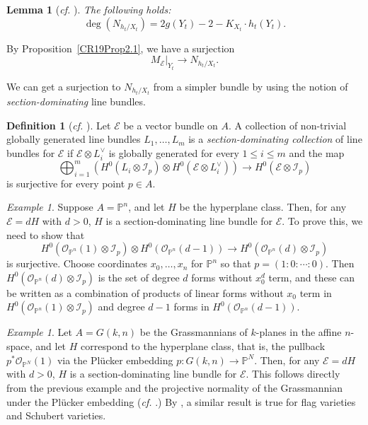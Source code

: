 \documentclass[11pt]{amsart}
\numberwithin{equation}{section}
\newtheorem{lemma}[theorem]{Lemma}
\theoremstyle{definition}
\newtheorem{definition}[theorem]{Definition}
\theoremstyle{remark}
\newtheorem{example}[theorem]{Example}
\newcommand{\cI}{\mathcal{I}}
\newcommand{\cO}{\mathcal{O}}
\renewcommand{\P}{\mathbb{P}}
\newcommand{\lra}{\longrightarrow}
\begin{document}
\begin{lemma}[\textit{cf.} {\cite[Lemma 2.2]{CR19}}] \label{deggenus}
The following holds:
\[ \deg \left(N_{h_t/X_t}\right) = 2g(Y_t)-2 - K_{X_t}\cdot h_t(Y_t). \]
\end{lemma}

By Proposition~\ref{CR19Prop2.1}, we have a surjection
\begin{equation}\label{surjection_from_M_E}
    M_{\mathcal{E}}|_{Y_t}\lra N_{h_t/X_t}.
\end{equation}

We can get a surjection to $N_{h_t/X_t}$ from a simpler bundle by using the notion of \textit{section-dominating} line bundles.

\begin{definition}[\textit{cf.} {\cite[Definition 2.3]{CR19}}]\label{definition_section_dominating}
Let $\mathcal{E}$ be a vector bundle on $A$. A collection of non-trivial globally generated line bundles $L_1, \hdots , L_m$ is a \textit{section-dominating collection} of line bundles for $\mathcal{E}$ if $\mathcal{E}\otimes L_i^\vee$ is globally generated for every $1\le i\le m$ and the map
\[ \bigoplus_{i=1}^{m} \left ( H^0(L_i\otimes \cI_p)\otimes H^0\left(\mathcal{E}\otimes L_i^\vee\right) \right )\lra H^0(\mathcal{E}\otimes \cI_p) \]
is surjective for every point $p\in A$.
\end{definition}

\begin{example}
Suppose $A = \P^n$, and let $H$ be the hyperplane class. Then, for any $\mathcal{E} = dH$ with $d>0$, $H$ is a section-dominating line bundle for $\mathcal{E}$. To prove this, we need to show that
\[ H^0\left(\cO_{\P^n}(1)\otimes \cI_p\right)\otimes H^0\left(\cO_{\P^n}(d-1)\right)\lra H^0\left(\cO_{\P^n}(d)\otimes \cI_p\right) \]
is surjective. Choose coordinates $x_0, \hdots , x_n$ for $\P^n$ so that $p=(1:0:\cdots:0)$. Then
$H^0(\cO_{\P^n}(d)\otimes \cI_p)$ is the set of degree $d$ forms without $x_0^d$ term, and these can be written as a combination of products of linear forms without $x_0$ term in $H^0(\cO_{\P^n}(1)\otimes \cI_p)$ and degree $d-1$ forms in $H^0(\cO_{\P^n}(d-1))$.
\end{example}

\begin{example}\label{section-dominating}
Let $A = G(k,n)$ be the Grassmannians of $k$-planes in the affine $n$-space, and let $H$ correspond to the hyperplane class, that is, the pullback $p^*\cO_{\P^N}(1)$ via the Pl\"ucker embedding $p\colon G(k,n)\to \P^N$. Then, for any $\mathcal{E} = dH$ with $d>0$, $H$ is a section-dominating line bundle for $\mathcal{E}$. This follows directly from the previous example and the projective normality of the Grassmannian under the Pl\"ucker embedding (\textit{cf.} \cite{RR85}.) By \cite{RR85}, a similar result is true for flag varieties and Schubert varieties.
\end{example}
\end{document}
